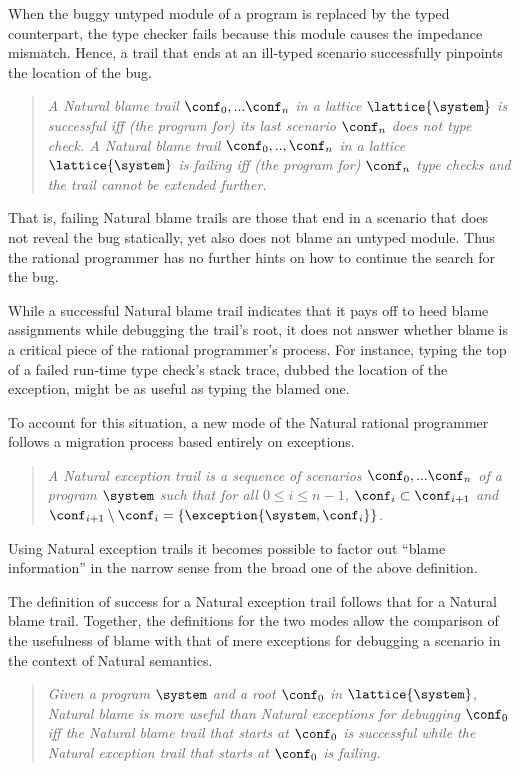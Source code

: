 When the buggy untyped module of a program is replaced by the typed counterpart,
the type checker fails because this module causes the impedance mismatch. Hence, a
trail that ends at an ill-typed scenario successfully pinpoints the location of
the bug. 
\begin{quote}
\it A {\em Natural blame trail\/} $\conf_0,...\conf_n$ in a lattice $\lattice{\system}$ is
\emph{successful}\/ iff (the program for) its last scenario $\conf_n$ does not type check.  A Natural
blame trail $\conf_0,..,\conf_n$ in a lattice $\lattice{\system}$ is \emph{failing\/}
iff (the program for) $\conf_n$ type checks and the trail cannot be extended further.
\end{quote}
That is, failing Natural blame trails are those that end in a scenario that does not reveal the bug statically, yet also does not blame
an untyped module. Thus the rational programmer has
no further hints on how to continue the search for the bug.

While a successful Natural blame trail indicates that it 
pays off to heed blame assignments while debugging the trail's root, it does not answer whether
blame is a critical piece of the rational programmer's process.  For instance,
typing the top of a failed run-time type check's stack trace, dubbed the
location of the exception, might be as useful as typing the blamed one.

To account for this situation, a new mode of the Natural rational
programmer follows a migration process based entirely on exceptions.
\begin{quote}
\it A {\em Natural exception trail\/} is a sequence of scenarios $\conf_0,...\conf_n$ of a
program $\system$ such that for all $0 \leq i \leq n - 1$, $\conf_i \subset
\conf_{i+1}$ and $\conf_{i+1} \setminus \conf_i = \{\exception{\system, \conf_i}\}$.
\end{quote}
Using Natural exception trails it becomes possible to factor out
``blame information'' in the narrow sense from the broad one of the
above definition. 


The definition of success for a Natural exception trail follows that for
a Natural blame trail.
Together, the definitions for the two modes allow the comparison of the usefulness of blame 
with that of mere exceptions for debugging a scenario in the context of Natural semantics.
\begin{quote}
\it 
  Given a program $\system$ and a root $\conf_0$ in $\lattice{\system}$,
  Natural blame is \emph{more useful\/} than Natural exceptions for
  debugging $\conf_0$ iff 
  the Natural blame trail 
  that starts at $\conf_0$ is successful while the Natural exception trail that
  starts at $\conf_0$ is failing.
\end{quote}
